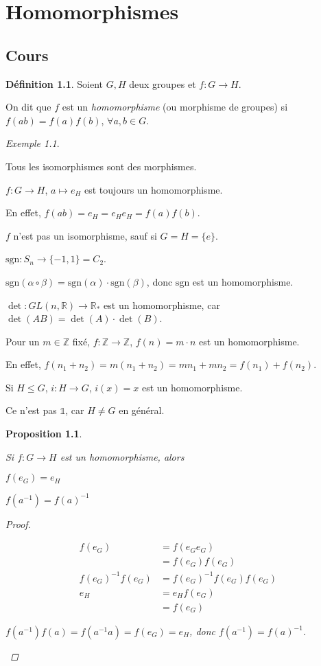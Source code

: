 \documentclass{report}
\newcounter{cours}
\newcommand*{\cours}{\section*{Cours \thecours}\stepcounter{cours}}
\newcommand*{\lte}{\leqslant}
\newcommand*{\reels}{\mathbb{R}}
\newcommand*{\entiers}{\mathbb{Z}}
\newcommand*{\identite}{\mathds{1}}
\newtheorem*{prop}{Proposition}
\theoremstyle{definition}
\newtheorem*{defin}{D\'efinition}
\theoremstyle{remark}
\newtheorem*{exem}{Exemple}
\begin{document}
	\chapter{Homomorphismes}
	\cours
	\begin{defin}
		Soient $G,H$ deux groupes et $f:G \to H$.

		On dit que $f$ est un \emph{homomorphisme} (ou morphisme de groupes) si $f(ab) = f(a)f(b)$, $\forall a,b \in G$.
	\end{defin}
	\begin{exem}~

		\begin{nlist}
			\item Tous les isomorphismes sont des morphismes.
			\item $f:G \to H$, $a \mapsto e_H$ est toujours un homomorphisme.

			En effet, $f(ab) = e_H = e_H e_H = f(a) f(b)$.

			$f$ n'est pas un isomorphisme, sauf si $G=H=\{e\}$.
			\item $\mathrm{sgn}:S_n \to \{-1,1\} = C_2$.

			$\mathrm{sgn}(\alpha \circ \beta) = \mathrm{sgn}(\alpha) \cdot \mathrm{sgn}(\beta)$, donc $\mathrm{sgn}$ est un homomorphisme.
			\item $\det:GL(n, \reels) \to \reels_*$ est un homomorphisme, car $\det(AB) = \det(A) \cdot \det(B)$.
			\item Pour un $m \in \entiers$ fix\'e, $f:\entiers \to \entiers$, $f(n) = m \cdot n$ est un homomorphisme.

			En effet, $f(n_1+n_2) = m(n_1+n_2) = mn_1 + mn_2 = f(n_1) + f(n_2)$.
			\item Si $H \lte G$, $i:H \to G$, $i(x)=x$ est un homomorphisme.

			Ce n'est pas $\identite$, car $H \neq G$ en g\'en\'eral.
		\end{nlist}
	\end{exem}
	\begin{prop}~

		Si $f:G \to H$ est un homomorphisme, alors
		\begin{nlist}
			\item $f(e_G) = e_H$
			\item $f(a^{-1}) = f(a)^{-1}$
		\end{nlist}
		\begin{proof}~

			\begin{nlist}
				\item
				\begin{align*}
					f(e_G)&= f(e_G e_G)\\
					&= f(e_G) f(e_G)\\
					f(e_G)^{-1}f(e_G)&= f(e_G)^{-1} f(e_G) f(e_G)\\
					e_H&= e_H f(e_G)\\
					&= f(e_G)
				\end{align*}
				\item $f(a^{-1}) f(a) = f(a^{-1}a) = f(e_G) = e_H$, donc $f(a^{-1}) = f(a)^{-1}$.
			\end{nlist}
		\end{proof}
	\end{prop}
\end{document}
